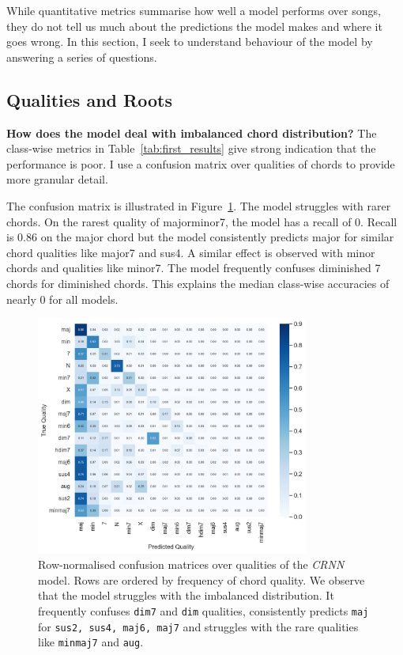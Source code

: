 While quantitative metrics summarise how well a model performs over songs, they do not tell us much about the predictions the model makes and where it goes wrong. In this section, I seek to understand behaviour of the model by answering a series of questions.

\subsection{Qualities and Roots}

\textbf{How does the model deal with imbalanced chord distribution?} The class-wise metrics in Table~\ref{tab:first_results} give strong indication that the performance is poor. I use a confusion matrix over qualities of chords to provide more granular detail. 

The confusion matrix is illustrated in Figure~\ref{fig:crnn_qual_cm}. The model struggles with rarer chords. On the rarest quality of majorminor7, the model has a recall of $0$. Recall is $0.86$ on the major chord but the model consistently predicts major for similar chord qualities like major7 and sus4. A similar effect is observed with minor chords and qualities like minor7. The model frequently confuses diminished 7 chords for diminished chords. This explains the median class-wise accuracies of nearly $0$ for all models.

\begin{figure}[h]
    \centering
    \includegraphics[width=0.8\textwidth]{figures/confusion_matrix_qualities.png}
    \caption{Row-normalised confusion matrices over qualities of the \emph{CRNN} model. Rows are ordered by frequency of chord quality. We observe that the model struggles with the imbalanced distribution. It frequently confuses \texttt{dim7} and \texttt{dim} qualities, consistently predicts \texttt{maj} for \texttt{sus2, sus4, maj6, maj7} and struggles with the rare qualities like \texttt{minmaj7} and \texttt{aug}.}\label{fig:crnn_qual_cm}
\end{figure}

